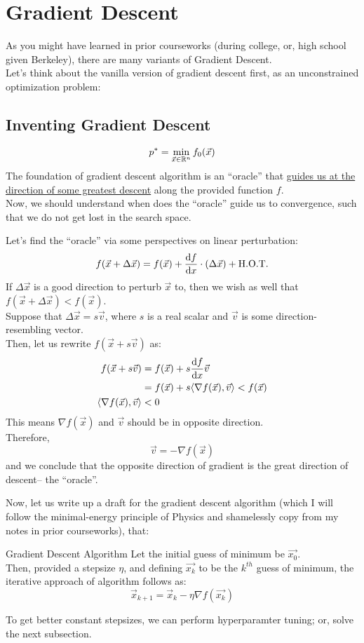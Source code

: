 \section{Gradient Descent}
As you might have learned in prior courseworks (during college, or, high school given Berkeley), there are many variants of Gradient Descent. \\
Let's think about the vanilla version of gradient descent first, as an unconstrained optimization problem:

\subsection{Inventing Gradient Descent}
\[
    p^* = \min_{\vec{x} \in \mathbb{R}^n} f_0(\vec{x})
\]
The foundation of gradient descent algorithm is an ``oracle'' that \underline{guides us at the direction of some greatest descent} along the provided function $f$. \\
Now, we should understand when does the ``oracle'' guide us to convergence, such that we do not get lost in the search space.
\par
Let's find the ``oracle'' via some perspectives on linear perturbation:
\begin{align*}
    f(\vec{x} + \Delta \vec{x}) = f(\vec{x}) + \dv{f}{x} \cdot (\Delta \vec{x}) + \text{H.O.T.}
\end{align*}
If $\Delta \vec{x}$ is a good direction to perturb $\vec{x}$ to, then we wish as well that $f(\vec{x} + \Delta \vec{x}) < f(\vec{x})$. \\
Suppose that $\Delta \vec{x} = s \vec{v}$, where $s$ is a real scalar and $\vec{v}$ is some direction-resembling vector. \\
Then, let us rewrite $f(\vec{x} + s \vec{v})$ as:
\begin{align*}
    f(\vec{x} + s \vec{v})
    &= f(\vec{x}) + s \dv{f}{x} {} \vec{v} \\
    &= f(\vec{x}) + s \langle \nabla f(\vec{x}), \vec{v} \rangle < f(\vec{x}) \\
    \langle \nabla f(\vec{x}), \vec{v} \rangle &< 0
\end{align*}
This means $\nabla f(\vec{x})$ and $\vec{v}$ should be in opposite direction. \\
Therefore,
\[
    \vec{v} = - \nabla f(\vec{x})
\]
and we conclude that the opposite direction of gradient is the great direction of descent-- the ``oracle''.
\par
Now, let us write up a draft for the gradient descent algorithm (which I will follow the minimal-energy principle of Physics and shamelessly copy from my notes in prior courseworks), that:
\begin{ln-define}{Gradient Descent Algorithm}{}
    Let the initial guess of minimum be $\vec{x_0}$. \\
    Then, provided a stepsize $\eta$, and defining $\vec{x_k}$ to be the $k^{th}$ guess of minimum, the iterative approach of algorithm follows as:
    \[
        \vec{x}_{k + 1} = \vec{x}_k - \eta \nabla f(\vec{x_k})
    \]
\end{ln-define}
To get better constant stepsizes, we can perform hyperparamter tuning; or, solve the next subsection.

